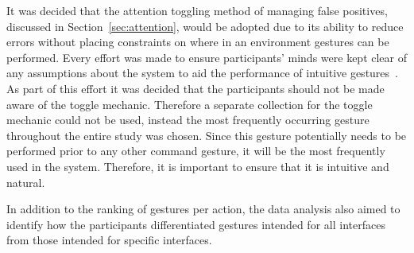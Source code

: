 \documentclass[manuscript, review, screen]{acmart}
\begin{document}
It was decided that the attention toggling method of managing false positives, discussed in Section~\ref{sec:attention}, would be adopted due to its ability to reduce errors without placing constraints on where in an environment gestures can be performed.
Every effort was made to ensure participants' minds were kept clear of any assumptions about the system to aid the performance of intuitive gestures~\cite{Nielsen2004}.
As part of this effort it was decided that the participants should not be made aware of the toggle mechanic.
Therefore a separate collection for the toggle mechanic could not be used, instead the most frequently occurring gesture throughout the entire study was chosen.
Since this gesture potentially needs to be performed prior to any other command gesture, it will be the most frequently used in the system.
Therefore, it is important to ensure that it is intuitive and natural.

In addition to the ranking of gestures per action, the data analysis also aimed to identify how the participants differentiated gestures intended for all interfaces from those intended for specific interfaces.




\end{document}
